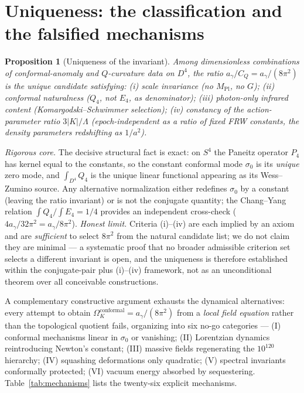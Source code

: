 \documentclass[11pt,a4paper]{article}
\theoremstyle{plain}
\newtheorem{proposition}[theorem]{Proposition}
\theoremstyle{definition}
\theoremstyle{remark}
\newcommand{\Ok}{\Omega_K}
\newcommand{\ag}{a_\gamma}
\newcommand{\CQ}{C_Q}
\newcommand{\Mpl}{M_{\mathrm{Pl}}}
\begin{document}
\section{Uniqueness: the classification and the falsified mechanisms}
\label{sec:uniqueness}

\begin{proposition}[Uniqueness of the invariant]
\label{prop:unique}
Among dimensionless combinations of conformal-anomaly and $Q$-curvature data on $D^4$, the
ratio $\ag/\CQ = \ag/(8\pi^2)$ is the unique candidate satisfying: (i) scale invariance (no
$\Mpl$, no $G$); (ii) conformal naturalness ($Q_4$, not $E_4$, as denominator); (iii) photon-only
infrared content (Komargodski--Schwimmer selection); (iv) constancy of the action-parameter
ratio $3|K|/\Lambda$ (epoch-independent as a ratio of fixed FRW constants, the density parameters
redshifting as $1/a^2$).
\end{proposition}

\noindent
\emph{Rigorous core.} The decisive structural fact is exact: on $S^4$ the Paneitz operator $P_4$
has kernel equal to the constants, so the constant conformal mode $\sigma_0$ is its \emph{unique}
zero mode, and $\int_{D^4} Q_4$ is the unique linear functional appearing as its Wess--Zumino
source. Any alternative normalization either redefines $\sigma_0$ by a constant (leaving the ratio
invariant) or is not the conjugate quantity; the Chang--Yang relation $\int Q_4/\int E_4 = 1/4$
provides an independent cross-check ($4\ag/32\pi^2 = \ag/8\pi^2$). \emph{Honest limit.} Criteria
(i)--(iv) are each implied by an axiom and are \emph{sufficient} to select $8\pi^2$ from the
natural candidate list; we do not claim they are minimal --- a systematic proof that no broader
admissible criterion set selects a different invariant is open, and the uniqueness is therefore
established within the conjugate-pair plus (i)--(iv) framework, not as an unconditional theorem
over all conceivable constructions.

A complementary constructive argument exhausts the dynamical alternatives: every attempt to
obtain $\Ok^{\mathrm{conformal}} = \ag/(8\pi^2)$ from a \emph{local field equation} rather than
the topological quotient fails, organizing into six no-go categories --- (I) conformal
mechanisms linear in $\sigma_0$ or vanishing; (II) Lorentzian dynamics reintroducing Newton's
constant; (III) massive fields regenerating the $10^{120}$ hierarchy; (IV) squashing
deformations only quadratic; (V) spectral invariants conformally protected; (VI) vacuum energy
absorbed by sequestering. Table~\ref{tab:mechanisms} lists the twenty-six explicit mechanisms.
\end{document}
